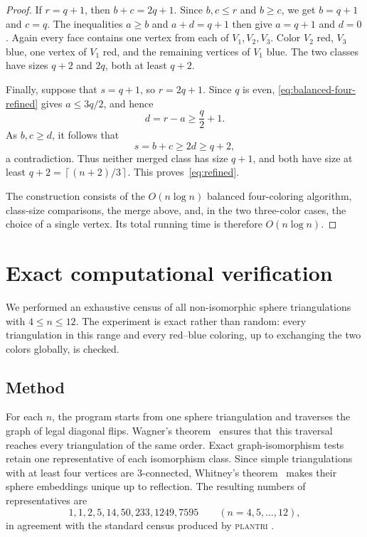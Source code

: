 \documentclass[11pt]{amsart}
\newcommand{\ceil}[1]{\left\lceil #1\right\rceil}
\begin{document}
\begin{proof}
If $r=q+1$, then $b+c=2q+1$.  Since $b,c\le r$ and $b\ge c$, we get
$b=q+1$ and $c=q$.  The inequalities $a\ge b$ and $a+d=q+1$ then give
$a=q+1$ and $d=0$.  Again every face contains one vertex from each of
$V_1,V_2,V_3$.  Color $V_2$ red, $V_3$ blue, one vertex of $V_1$ red,
and the remaining vertices of $V_1$ blue.  The two classes have sizes
$q+2$ and $2q$, both at least $q+2$.

Finally, suppose that $s=q+1$, so $r=2q+1$.  Since $q$ is even,
\eqref{eq:balanced-four-refined} gives $a\le3q/2$, and hence
\[
  d=r-a\ge\frac q2+1.
\]
As $b,c\ge d$, it follows that
\[
  s=b+c\ge2d\ge q+2,
\]
a contradiction.  Thus neither merged class has size $q+1$, and both
have size at least
$q+2=\ceil{(n+2)/3}$.  This proves~\eqref{eq:refined}.

The construction consists of the $O(n\log n)$ balanced four-coloring
algorithm, class-size comparisons, the merge above, and, in the two
three-color cases, the choice of a single vertex.  Its total running time
is therefore $O(n\log n)$.
\end{proof}

\section{Exact computational verification}\label{sec:computation}

We performed an exhaustive census of all non-isomorphic sphere triangulations
with $4\le n\le12$.  The experiment is exact rather than random: every
triangulation in this range and every red--blue coloring, up to exchanging the
two colors globally, is checked.

\subsection{Method}

For each $n$, the program starts from one sphere triangulation and traverses
the graph of legal diagonal flips.  Wagner's theorem~\cite{Wagner1936}
ensures that this traversal reaches every triangulation of the same order.
Exact graph-isomorphism tests retain one representative of each isomorphism
class.  Since simple triangulations with at least four vertices are
$3$-connected, Whitney's theorem~\cite{Whitney1932} makes their sphere
embeddings unique up to reflection.  The resulting numbers of representatives
are
\[
  1,1,2,5,14,50,233,1249,7595
  \qquad (n=4,5,\ldots,12),
\]
in agreement with the standard census produced by \textsc{plantri}
\cite{BrinkmannMcKay2007}.
\end{document}
